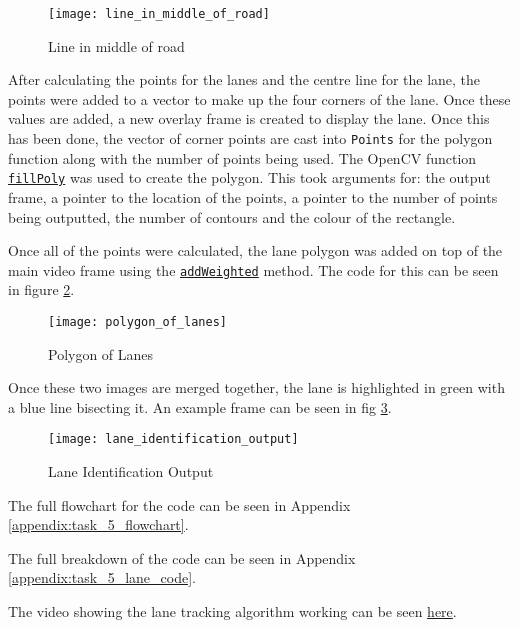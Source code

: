 \documentclass[conference]{IEEEtran}
\begin{document}
\begin{figure}[H]
\centerline{\texttt{[image: line\_in\_middle\_of\_road]}}
\caption{Line in middle of road}
\label{fig:line_in_middle_of_road}
\end{figure}

After calculating the points for the lanes and the centre line for the lane, the points were added to a vector to make up the four corners of the lane. Once these values are added, a new overlay frame is created to display the lane. Once this has been done, the vector of corner points are cast into \texttt{Points} for the polygon function along with the number of points being used. The OpenCV function \href{https://docs.opencv.org/4.x/d6/d6e/group__imgproc__draw.html#ga311160e71d37e3b795324d097cb3a7dc}{\texttt{fillPoly}} was used to create the polygon. This took arguments for: the output frame, a pointer to the location of the points, a pointer to the number of points being outputted, the number of contours and the colour of the rectangle.

Once all of the points were calculated, the lane polygon was added on top of the main video frame using the \href{https://docs.opencv.org/4.x/d2/de8/group__core__array.html#gafafb2513349db3bcff51f54ee5592a19}{\texttt{addWeighted}} method. The code for this can be seen in figure \ref{fig:polygon_of_lanes}.

\begin{figure}[H]
\centerline{\texttt{[image: polygon\_of\_lanes]}}
\caption{Polygon of Lanes}
\label{fig:polygon_of_lanes}
\end{figure}

Once these two images are merged together, the lane is highlighted in green with a blue line bisecting it. An example frame can be seen in fig \ref{fig:lane_identification_output}.

\begin{figure}[H]
\centerline{\texttt{[image: lane\_identification\_output]}}
\caption{Lane Identification Output}
\label{fig:lane_identification_output}
\end{figure}

The full flowchart for the code can be seen in Appendix \ref{appendix:task_5_flowchart}.

The full breakdown of the code can be seen in Appendix \ref{appendix:task_5_lane_code}.

The video showing the lane tracking algorithm working can be seen \href{https://youtu.be/Xw9haUy82Ps}{here}.
\end{document}
